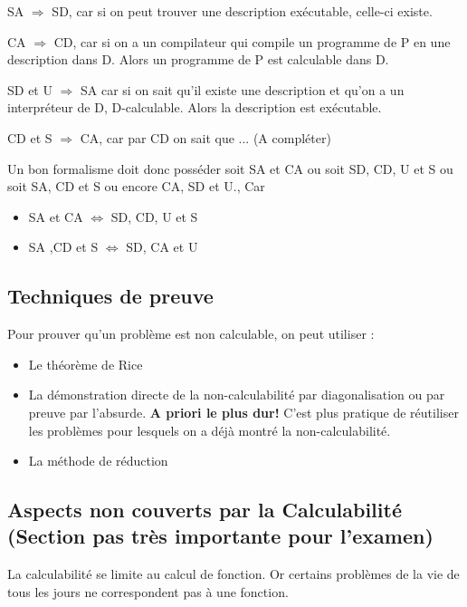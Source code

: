 \begin{myprop}
	SA $\Rightarrow$ SD, car si on peut trouver une description exécutable,
	celle-ci existe.
\end{myprop}

\begin{myprop}
	CA $\Rightarrow$ CD, car si on a un compilateur qui compile un programme 
	de P en une description dans D. Alors un programme de P est calculable dans D.
\end{myprop}

\begin{myprop}
	SD et U $\Rightarrow$ SA car si on sait qu'il existe une description et 
qu'on a un interpréteur de D, D-calculable. Alors la description est exécutable.
\end{myprop}

\begin{myprop}
	CD et S $\Rightarrow$ CA, car par CD on sait que ... (A compléter)
\end{myprop}

Un bon formalisme doit donc posséder soit SA et CA ou soit SD, CD, U et S ou 
soit SA, CD et S ou encore CA, SD et U., Car
\begin{itemize}
	\item SA et CA $\iff$ SD, CD, U et S
	\item SA ,CD et S $\iff$ SD, CA et U
\end{itemize}

\subsection{Techniques de preuve}
\label{sub:techniques_de_preuve}

Pour prouver qu'un problème est non calculable, on peut utiliser :
\begin{itemize}
	\item Le théorème de Rice
	\item La démonstration directe de la non-calculabilité par 
		diagonalisation ou par preuve par l'absurde. 
		\textbf{A priori le plus dur!} C'est plus pratique de réutiliser les problèmes pour 
		lesquels on a déjà montré la non-calculabilité.
	\item La méthode de réduction
\end{itemize}

\subsection{Aspects non couverts par la Calculabilité (Section pas très
	importante pour l'examen)}
\label{sub:aspects_non_couvert_par_la_calculabilit_}
La calculabilité se limite au calcul de fonction. Or certains problèmes de la vie 
de tous les jours ne correspondent pas à une fonction.

